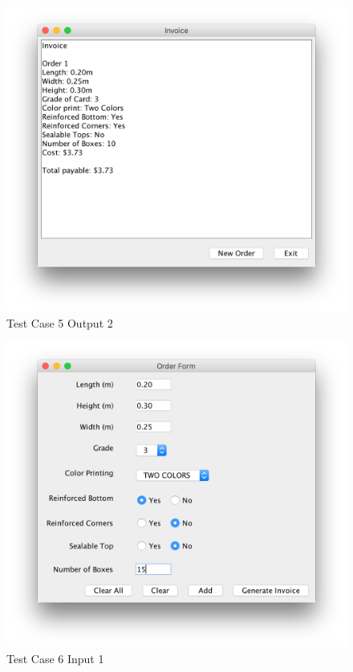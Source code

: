 \documentclass[12pt]{article}
\begin{document}
\begin{figure}[H]
	\includegraphics[width=\linewidth]{./screenshots/test_case_5_output_2.png}
	\caption{Test Case 5 Output 2}
	\label{test_case_5_output}
\end{figure}
\begin{figure}[H]
	\includegraphics[width=\linewidth]{./screenshots/test_case_6_order1_input.png}
	\caption{Test Case 6 Input 1}
	\label{test_case_6_input_1}
\end{figure}
\end{document}
